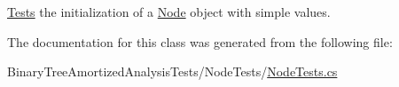 \hyperlink{namespace_binary_tree_amortized_analyis_1_1_tests}{Tests} the initialization of a \hyperlink{class_binary_tree_amortized_analyis_1_1_node}{Node} object with simple values. 



The documentation for this class was generated from the following file\+:\begin{DoxyCompactItemize}
\item 
Binary\+Tree\+Amortized\+Analysis\+Tests/\+Node\+Tests/\hyperlink{_node_tests_8cs}{Node\+Tests.\+cs}\end{DoxyCompactItemize}
